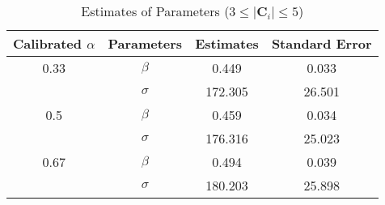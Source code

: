\begin{table}[H]
    \centering
    \caption{Estimates of Parameters ($3 \leq |\mathbf{C}_i| \leq 5$)}
    \label{table: estimates (min_size=3 max_size=5 margin=2000)}
    \begin{tabular}{cccc}
        \toprule
        Calibrated $\alpha$ & Parameters & Estimates & Standard Error \\
        \midrule
        0.33                & $\beta$    & 0.449     & 0.033          \\
                            & $\sigma$   & 172.305   & 26.501         \\
        \midrule
        0.5                 & $\beta$    & 0.459     & 0.034          \\
                            & $\sigma$   & 176.316   & 25.023         \\
        \midrule
        0.67                & $\beta$    & 0.494     & 0.039          \\
                            & $\sigma$   & 180.203   & 25.898         \\
        \bottomrule
    \end{tabular}
\end{table}
